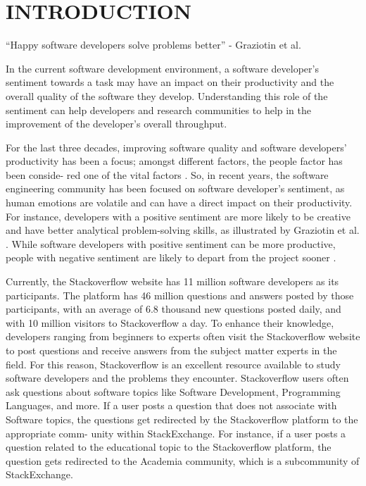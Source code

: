 \chapter{INTRODUCTION}

\begin{center}
``Happy software developers solve problems better'' - Graziotin et al. \cite{graziotin2014happy}
\end{center}

In the current software development environment, a software developer's sentiment towards a task may have an impact on their productivity and the overall quality of the software they develop. Understanding this role of the sentiment can help developers and research communities to help in the improvement of the developer's overall throughput.

For the last three decades, improving software quality and software developers' productivity has been a focus; amongst different factors, the people factor has been conside- red one of the vital factors \cite{graziotin2014happy, boehm1988understanding}. So, in recent years, the software engineering community has been focused on software developer's sentiment, as human emotions are volatile and can have a direct impact on their productivity. For instance, developers with a positive sentiment are more likely to be creative and have better analytical problem-solving skills, as illustrated by Graziotin et al. \cite{graziotin2014happy}. While software developers with positive sentiment can be more productive, people with negative sentiment are likely to depart from the project sooner \cite{garcia2013role}.

Currently, the Stackoverflow \cite{stackoverflow2019} website has 11 million software developers as its participants. The platform has 46 million questions and answers posted by those participants, with an average of 6.8 thousand new questions posted daily, and with 10 million visitors to Stackoverflow a day. To enhance their knowledge, developers ranging from beginners to experts often visit the Stackoverflow website to post questions and receive answers from the subject matter experts in the field. For this reason, Stackoverflow is an excellent resource available to study software developers and the problems they encounter. Stackoverflow users often ask questions about software topics like Software Development, Programming Languages, and more. If a user posts a question that does not associate with Software topics, the questions get redirected by the Stackoverflow platform to the appropriate comm- unity within StackExchange. For instance, if a user posts a question related to the educational topic to the Stackoverflow platform, the question gets redirected to the Academia community, which is a subcommunity of StackExchange.

